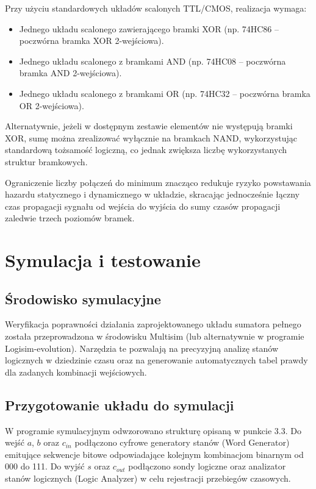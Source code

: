 \documentclass[12pt,a4paper]{article}
\begin{document}
Przy użyciu standardowych układów scalonych TTL/CMOS, realizacja wymaga:

\begin{itemize}
    \item Jednego układu scalonego zawierającego bramki XOR (np. 74HC86 -- poczwórna bramka XOR 2-wejściowa).
    \item Jednego układu scalonego z bramkami AND (np. 74HC08 -- poczwórna bramka AND 2-wejściowa).
    \item Jednego układu scalonego z bramkami OR (np. 74HC32 -- poczwórna bramka OR 2-wejściowa).
\end{itemize}

Alternatywnie, jeżeli w dostępnym zestawie elementów nie występują bramki XOR, sumę można zrealizować wyłącznie na bramkach NAND, wykorzystując standardową tożsamość logiczną, co jednak zwiększa liczbę wykorzystanych struktur bramkowych.

Ograniczenie liczby połączeń do minimum znacząco redukuje ryzyko powstawania hazardu statycznego i dynamicznego w układzie, skracając jednocześnie łączny czas propagacji sygnału od wejścia do wyjścia do sumy czasów propagacji zaledwie trzech poziomów bramek.


\section{Symulacja i testowanie}

\subsection{Środowisko symulacyjne}

Weryfikacja poprawności działania zaprojektowanego układu sumatora pełnego została przeprowadzona w środowisku Multisim (lub alternatywnie w programie Logisim-evolution). Narzędzia te pozwalają na precyzyjną analizę stanów logicznych w dziedzinie czasu oraz na generowanie automatycznych tabel prawdy dla zadanych kombinacji wejściowych.

\subsection{Przygotowanie układu do symulacji}

W programie symulacyjnym odwzorowano strukturę opisaną w punkcie 3.3. Do wejść $a$, $b$ oraz $c_{in}$ podłączono cyfrowe generatory stanów (Word Generator) emitujące sekwencje bitowe odpowiadające kolejnym kombinacjom binarnym od 000 do 111. Do wyjść $s$ oraz $c_{out}$ podłączono sondy logiczne oraz analizator stanów logicznych (Logic Analyzer) w celu rejestracji przebiegów czasowych.
\end{document}
